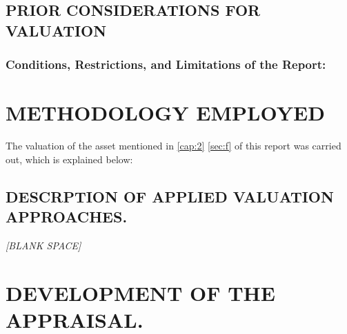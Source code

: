 \documentclass[10pt,letter]{report}
\renewcommand{\espacio}[1]{\vspace{#1}\begin{center}\textit{[BLANK SPACE]}\end{center}\newpage}
\begin{document}
\section{PRIOR CONSIDERATIONS FOR VALUATION}\label{sec:j}

	\subsection{Conditions, Restrictions, and Limitations of the Report:}



\newpage



	
\chapter{METHODOLOGY EMPLOYED}\label{cap:4}
\thispagestyle{fancy}

The valuation of the asset mentioned in \autoref{cap:2}  \autoref{sec:f} of this report was carried out, which is explained below:

\setcounter{section}{10}
\section{DESCRPTION OF APPLIED VALUATION APPROACHES.}\label{sec:k}

\renewcommand\thefigure{\arabic{figure}} 









\espacio{4cm}



\chapter{DEVELOPMENT OF THE APPRAISAL.}\label{cap:5}
\thispagestyle{fancy}
\end{document}
